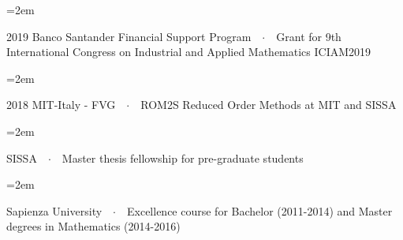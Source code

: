 \documentclass{scrartcl}
\newcommand{\Description}[1]{\hangindent=2em\hangafter=0\noindent\raggedright\footnotesize{#1}\par\normalsize\vspace{1em}} %
\begin{document}
\begin{cv}{}
\vspace{-0.5em} %

\Description{{\color{violet}2019 Banco Santander Financial Support Program}\ \ $\cdotp$\ \   Grant for 9th International Congress on Industrial and Applied Mathematics ICIAM2019}

\vspace{-0.5em} %


\Description{{\color{violet}2018 MIT-Italy - FVG}\ \ $\cdotp$\ \  ROM2S Reduced Order Methods at MIT and SISSA}

\vspace{-0.5em} %


%


\Description{{\color{violet}SISSA}\ \ $\cdotp$\ \ Master thesis fellowship for pre-graduate students}

\vspace{-0.5em} %

\Description{{\color{violet}Sapienza University}\ \ $\cdotp$\ \ Excellence course for Bachelor (2011-2014) and Master degrees in Mathematics (2014-2016)}





\end{cv}
\end{document}
